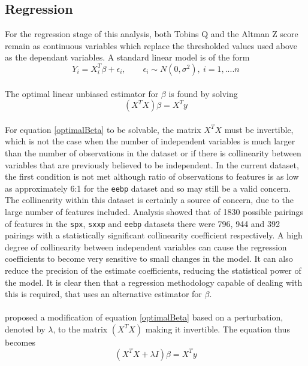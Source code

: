 {\subsection{Regression}
{For the regression stage of this analysis, both Tobins Q and the Altman Z score remain as continuous variables which replace the thresholded values used above as the dependant variables.  A standard linear model is of the form
\begin {equation}\label{linearModel}
Y_i = X_i^T \beta + \epsilon_i, \qquad \epsilon_i \sim N(0, \sigma^2), \ i = 1,....n
\end{equation}\\
The optimal linear unbiased estimator for $\beta$ is found by solving 
\begin {equation}\label{optimalBeta}
(X^T X)\beta = X^T y
\end{equation}\\
For equation \ref{optimalBeta} to be solvable, the matrix $X^T X$ must be invertible, which is not the case when the number of independent variables is much larger than the number of observations in the dataset or if there is collinearity between variables that are previously believed to be independent. In the current dataset, the first condition is not met although ratio of observations to features is as low as approximately 6:1 for the \texttt{eebp} dataset and so may still be a valid concern. The collinearity within this dataset is certainly a source of concern, due to the large number of features included. Analysis showed that of 1830 possible pairings of features in the \texttt{spx}, \texttt{sxxp} and \texttt{eebp} datasets there were 796, 944 and 392 pairings with a statistically significant collinearity coefficient respectively. A high degree of collinearity between independent variables can cause the regression coefficients to become very sensitive to small changes in the model. It can also reduce the precision of the estimate coefficients, reducing the statistical power of the model.  It is clear then that a regression methodology capable of dealing with this is required, that uses an alternative estimator for $\beta$. \\\\
\cite{hoerlRidge} proposed a modification of equation \ref{optimalBeta} based on a perturbation, denoted by $\lambda$, to the matrix $(X^T X)$ making it invertible. The equation thus becomes
\begin {equation}\label{optimalBetaPurt}
(X^T X + \lambda I )\beta = X^T y
\end{equation}\\
}}
